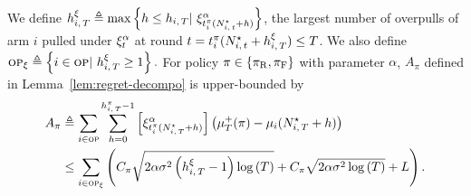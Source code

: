 \begin{lemma}
\label{lem:rested-A}
We define $\hiT^\xi \triangleq \max\left\{ h \leq \hiT | \ \xi^\alpha_{t_i^{\pi}(\Nit^\star + h)}\right\}$, the largest number of overpulls of arm $i$ pulled under $\xi^\alpha_t$ at round $t = t_i^{\pi}(N_{i,\,t}^\star + h_{i,\,T}^\xi) \leq T$. We also define $\textsc{op}_\xi \triangleq \left\{ i \in \textsc{op} | \  h_{i,\,T}^\xi \geq 1 \right\}.$ For policy $\pi \in \left\{ \pi_{\rm R}, \pi_{\rm F}\right\}$ with parameter $\alpha$, $A_{\pi}$ defined in Lemma~\ref{lem:regret-decompo} is upper-bounded by
\begin{align*}
A_{\pi} &\triangleq  \sum_{i\in \textsc{op}}   \sum_{h=0}^{h_{i,\,T}^\pi-1}  \left[ \xi^\alpha_{t_i^{\pi}(N_{i,\,T}^\star + h) }\right] \left(\mu^+_T(\pi) - \mu_i(N_{i,\,T}^{\star} + h)\right) \\
& \leq \sum_{i\in \textsc{op}_\xi} \left(C_\pi\sqrt{2\alpha\sigma^2\left(h_{i,\,T}^\xi -1\right)\log\left(T\right)} +C_\pi\sqrt{2\alpha\sigma^2\log{\left(T\right)}}+  L\right).
\end{align*}
\end{lemma}
